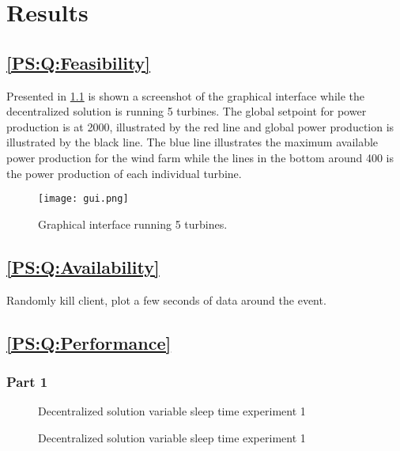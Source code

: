 
\chapter{Results}

\section{\ref{PS:Q:Feasibility}}
Presented in \cref{fig:graphicalInterface} is shown a screenshot of the graphical interface while the decentralized solution is running 5 turbines.
The global setpoint for power production is at 2000, illustrated by the red line and global power production is illustrated by the black line.
The blue line illustrates the maximum available power production for the wind farm while the lines in the bottom around 400 is the power production of each individual turbine.

\begin{figure} [!h]
	\centering
	\texttt{[image: gui.png]} 
	\caption[Graphical interface running 5 turbines]{
		\label{fig:graphicalInterface} 
		\footnotesize{%
			Graphical interface running 5 turbines.
		}
	}
\end{figure}


\section{\ref{PS:Q:Availability}}
Randomly kill client, plot a few seconds of data around the event.

\section{\ref{PS:Q:Performance}}



\subsection{Part 1}

\begin{figure}[h]
	
	\caption{Decentralized solution variable sleep time experiment 1}
	\label{fig:exp:decen:sleep}
\end{figure}

\begin{figure}[h]
	
	\caption{Decentralized solution variable sleep time experiment 1}
	\label{fig:exp:decen:sleep_cache}
\end{figure}

